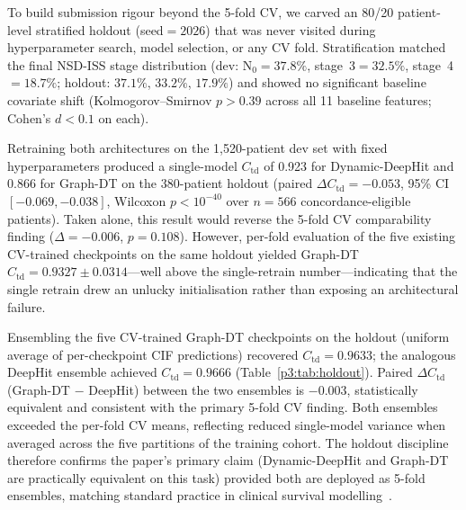 To build submission rigour beyond the 5-fold CV, we carved an 80/20 patient-level stratified holdout (seed${=}2026$) that was never visited during hyperparameter search, model selection, or any CV fold. Stratification matched the final NSD-ISS stage distribution (dev: N$_0{=}37.8\%$, stage~3${=}32.5\%$, stage~4${=}18.7\%$; holdout: $37.1\%$, $33.2\%$, $17.9\%$) and showed no significant baseline covariate shift (Kolmogorov--Smirnov $p{>}0.39$ across all 11 baseline features; Cohen's $d{<}0.1$ on each).

Retraining both architectures on the 1{,}520-patient dev set with fixed hyperparameters produced a single-model $C_\text{td}$ of 0.923 for Dynamic-DeepHit and 0.866 for Graph-DT on the 380-patient holdout (paired $\Delta C_\text{td}{=}{-}0.053$, 95\% CI $[-0.069, -0.038]$, Wilcoxon $p < 10^{-40}$ over $n{=}566$ concordance-eligible patients). Taken alone, this result would reverse the 5-fold CV comparability finding ($\Delta{=}{-}0.006$, $p{=}0.108$). However, per-fold evaluation of the five existing CV-trained checkpoints on the same holdout yielded Graph-DT $C_\text{td} = 0.9327 \pm 0.0314$---well above the single-retrain number---indicating that the single retrain drew an unlucky initialisation rather than exposing an architectural failure.

Ensembling the five CV-trained Graph-DT checkpoints on the holdout (uniform average of per-checkpoint CIF predictions) recovered $C_\text{td} = 0.9633$; the analogous DeepHit ensemble achieved $C_\text{td} = 0.9666$ (Table~\ref{p3:tab:holdout}). Paired $\Delta C_\text{td}$(Graph-DT $-$ DeepHit) between the two ensembles is ${-}0.003$, statistically equivalent and consistent with the primary 5-fold CV finding. Both ensembles exceeded the per-fold CV means, reflecting reduced single-model variance when averaged across the five partitions of the training cohort. The holdout discipline therefore confirms the paper's primary claim (Dynamic-DeepHit and Graph-DT are practically equivalent on this task) provided both are deployed as 5-fold ensembles, matching standard practice in clinical survival modelling~\cite{shamsutdinova2024survcompare}.

